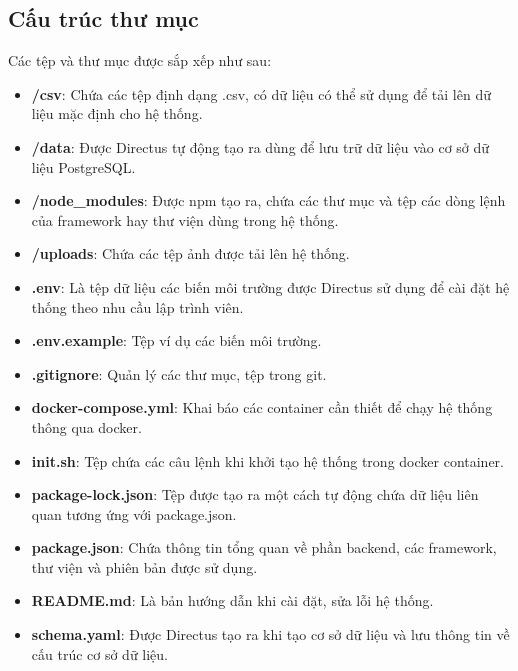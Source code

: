 \documentclass[./../main.tex]{subfiles}
\begin{document}
\subsection{Cấu trúc thư mục}
Các tệp và thư mục được sắp xếp như sau:
\begin{itemize}
    \item \textbf{/csv}: Chứa các tệp định dạng .csv, có dữ liệu có thể sử dụng để tải lên dữ liệu mặc định cho hệ thống.
    \item \textbf{/data}: Được Directus tự động tạo ra dùng để lưu trữ dữ liệu vào cơ sở dữ liệu PostgreSQL.
    \item \textbf{/node\_modules}: Được \acrshort{npm}  tạo ra, chứa các thư mục và tệp các dòng lệnh của framework hay thư viện dùng trong hệ thống.
    \item \textbf{/uploads}: Chứa các tệp ảnh được tải lên hệ thống.
    \item \textbf{.env}: Là tệp dữ liệu các biến môi trường được Directus sử dụng để cài đặt hệ thống theo nhu cầu lập trình viên.
    \item \textbf{.env.example}: Tệp ví dụ các biến môi trường.
    \item \textbf{.gitignore}: Quản lý các thư mục, tệp trong git.
    \item \textbf{docker-compose.yml}: Khai báo các container cần thiết để chạy hệ thống thông qua docker.
    \item \textbf{init.sh}: Tệp chứa các câu lệnh khi khởi tạo hệ thống trong docker container.
    \item \textbf{package-lock.json}: Tệp được tạo ra một cách tự động chứa dữ liệu liên quan tương ứng với package.json.
    \item \textbf{package.json}: Chứa thông tin tổng quan về phần backend, các framework, thư viện và phiên bản được sử dụng.
    \item \textbf{README.md}: Là bản hướng dẫn khi cài đặt, sửa lỗi hệ thống.
    \item \textbf{schema.yaml}: Được Directus tạo ra khi tạo cơ sở dữ liệu và lưu thông tin về cấu trúc cơ sở dữ liệu.
\end{itemize}
\end{document}

